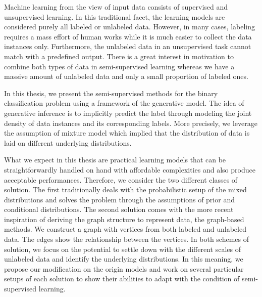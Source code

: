 Machine learning from the view of input data consists of supervised and unsupervised learning. In this traditional facet, the learning models are considered purely all labeled or unlabeled data. However, in many cases, labeling requires a mass effort of human works while it is much easier to collect the data instances only. Furthermore, the unlabeled data in an unsupervised task cannot match with a predefined output. There is a great interest in motivation to combine both types of data in semi-supervised learning whereas we have a massive amount of unlabeled data and only a small proportion of labeled ones.

In this thesis, we present the semi-supervised methods for the binary classification problem using a framework of the generative model. The idea of generative inference is to implicitly predict the label through modeling the joint density of data instances and its corresponding labels. More precisely, we leverage the assumption of mixture model which implied that the distribution of data is laid on different underlying distributions.

What we expect in this thesis are practical learning models that can be straightforwardly handled on hand with affordable complexities and also produce acceptable performances. Therefore, we consider the two different classes of solution. The first traditionally deals with the probabilistic setup of the mixed distributions and solves the problem through the assumptions of prior and conditional distributions. The second solution comes with the more recent inspiration of deriving the graph structure to represent data, the graph-based methods. We construct a graph with vertices from both labeled and unlabeled data. The edges show the relationship between the vertices. In both schemes of solution, we focus on the potential to settle down with the different scales of unlabeled data and identify the underlying distributions. In this meaning, we propose our modification on the origin models and work on several particular setups of each solution to show their abilities to adapt with the condition of semi-supervised learning.